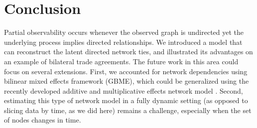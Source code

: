 \section{Conclusion}

Partial observability occurs whenever the observed graph is undirected yet the underlying process implies directed relationships. We introduced a model that can reconstruct the latent directed network ties, and illustrated its advantages on an example of bilateral trade agreements. The future work in this area could focus on several extensions. First, we accounted for network dependencies using bilinear mixed effects framework (GBME), which could be generalized using  the recently developed additive and multiplicative effects network model \citep{hoff:2015:arxiv,minhas:etal:2016:arxiv}. Second, estimating this type of network model in a fully dynamic setting (as opposed to slicing data by time, as we did here) remains a challenge, especially when the set of nodes changes in time.